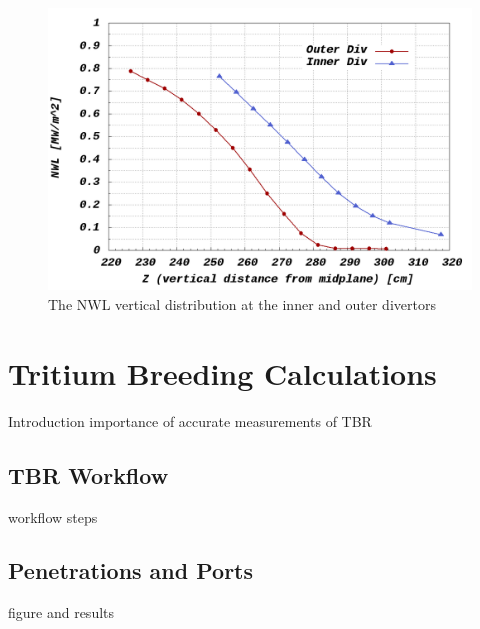 \documentclass[12pt, letterpaper]{elsarticle}
\begin{document}
\begin{figure}[h!]
  \centering
  \includegraphics[scale=0.3]{../plots/NWL_2divs.png}
  \caption{The NWL vertical distribution at the inner and outer divertors}
  \label{fig:NWL 2Divs}
\end{figure}

\section{Tritium Breeding Calculations} \label{Tritium Breeding Calculations}
Introduction
importance of accurate measurements of TBR
\subsection{TBR Workflow} \label{TBR Workflow}
workflow steps
\subsection{Penetrations and Ports} \label{Penetrations and Ports}
figure and results
\end{document}
